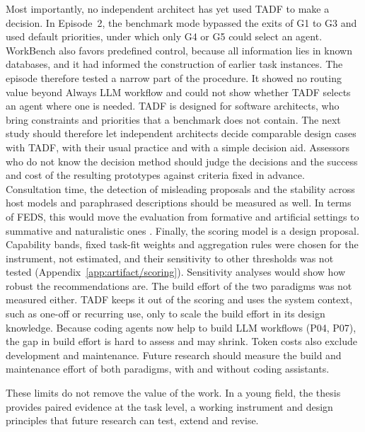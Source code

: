 Most importantly, no independent architect has yet used TADF to make a decision. In Episode~2, the benchmark mode bypassed the exits of G1 to G3 and used default priorities, under which only G4 or G5 could select an agent. WorkBench also favors predefined control, because all information lies in known databases, and it had informed the construction of earlier task instances. The episode therefore tested a narrow part of the procedure. It showed no routing value beyond Always LLM workflow and could not show whether TADF selects an agent where one is needed. TADF is designed for software architects, who bring constraints and priorities that a benchmark does not contain. The next study should therefore let independent architects decide comparable design cases with TADF, with their usual practice and with a simple decision aid. Assessors who do not know the decision method should judge the decisions and the success and cost of the resulting prototypes against criteria fixed in advance. Consultation time, the detection of misleading proposals and the stability across host models and paraphrased descriptions should be measured as well. In terms of FEDS, this would move the evaluation from formative and artificial settings to summative and naturalistic ones \parencite{venableFEDSFrameworkEvaluation2016}. Finally, the scoring model is a design proposal. Capability bands, fixed task-fit weights and aggregation rules were chosen for the instrument, not estimated, and their sensitivity to other thresholds was not tested (Appendix~\ref{app:artifact/scoring}). Sensitivity analyses would show how robust the recommendations are. The build effort of the two paradigms was not measured either. TADF keeps it out of the scoring and uses the system context, such as one-off or recurring use, only to scale the build effort in its design knowledge. Because coding agents now help to build LLM workflows (P04, P07), the gap in build effort is hard to assess and may shrink. Token costs also exclude development and maintenance. Future research should measure the build and maintenance effort of both paradigms, with and without coding assistants.

These limits do not remove the value of the work. In a young field, the thesis provides paired evidence at the task level, a working instrument and design principles that future research can test, extend and revise.